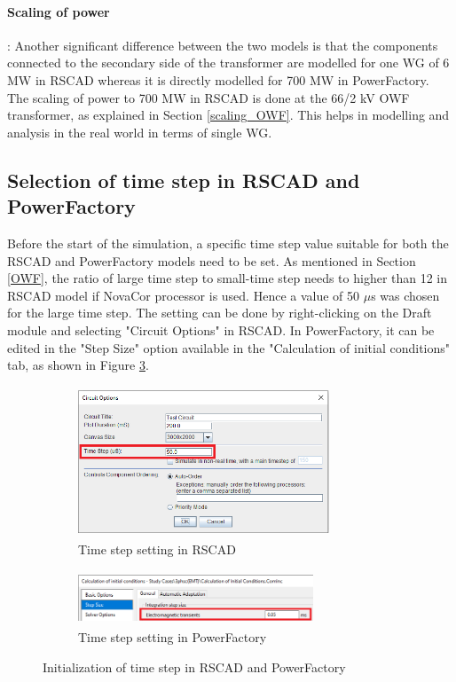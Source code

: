 \paragraph{Scaling of power}: Another significant difference between the two models is that the components connected to the secondary side of the transformer are modelled for one \gls{WG} of 6 MW in RSCAD whereas it is directly modelled for 700 MW in PowerFactory. The scaling of power to 700 MW in RSCAD is done at the 66/2 kV \gls{OWF} transformer, as explained in Section \ref{scaling_OWF}. This helps in modelling and analysis in the real world in terms of single \gls{WG}.


\subsection{Selection of time step in RSCAD and PowerFactory}
Before the start of the simulation, a specific time step value suitable for both the RSCAD and PowerFactory models need to be set. As mentioned in Section \ref{OWF}, the ratio of large time step to small-time step needs to higher than 12 in RSCAD model if NovaCor processor is used. Hence a value of 50 $\mu$s was chosen for the large time step. The setting can be done by right-clicking on the Draft module and selecting "Circuit Options" in RSCAD. In PowerFactory, it can be edited in the "Step Size" option available in the "Calculation of initial conditions" tab, as shown in Figure \ref{fig:Stepsize_RSCAD_PFD}.  

\begin{figure}[H]
\centering
\begin{subfigure}{.55\textwidth}
  \centering
  \includegraphics[height=4.5cm,width=7.5cm]{Diagrams/Chapter_3/Stepsize_RSCAD.PNG}
  \caption{Time step setting in RSCAD}
  \label{Stepsize_RSCAD}
\end{subfigure}%
\begin{subfigure}{.45\textwidth}
  \centering
  \includegraphics[height=1.6cm,width=7cm]{Diagrams/Chapter_3/Stepsize_PFD_Zoom.PNG}
  \caption{Time step setting in PowerFactory}
  \label{Stepsize_PFD_Zoom}
\end{subfigure}
\caption{Initialization of time step in RSCAD and PowerFactory}
\label{fig:Stepsize_RSCAD_PFD}
\end{figure}

